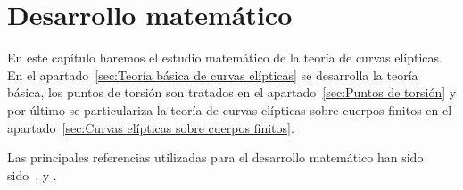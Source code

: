 \chapter{Desarrollo matemático}
\label{ch:Desarrollo matemático}

En este capítulo haremos el estudio matemático de la teoría de curvas elípticas. En el apartado~\ref{sec:Teoría básica de curvas elípticas} se desarrolla la teoría básica, los puntos de torsión son tratados en el apartado~\ref{sec:Puntos de torsión} y por último se particulariza la teoría de curvas elípticas sobre cuerpos finitos en el apartado~\ref{sec:Curvas elípticas sobre cuerpos finitos}.

Las principales referencias utilizadas para el desarrollo matemático han sido sido~\cite{Washington:2008}, \cite{Hankerson:2003} y \cite{Silverman:2009}.




